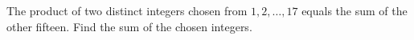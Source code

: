 The product of two distinct integers chosen from $1,2,\ldots,17$ equals the sum of the other fifteen. Find the sum of the chosen integers.
